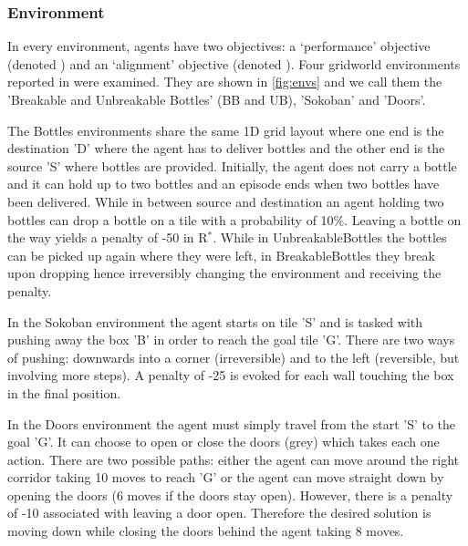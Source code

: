 \subsubsection{Environment}

In every environment, agents have two objectives: a `performance' objective (denoted \RP{}) and an `alignment' objective (denoted \RA{}). %
Four gridworld environments reported in \cite{vamplew_potential-based_2021} were examined.
They are shown in \ref{fig:envs} and we call them the 'Breakable and Unbreakable Bottles' (BB and UB), 'Sokoban' and 'Doors'.

The Bottles environments share the same 1D grid layout where one end is the destination 'D' where the agent has to deliver bottles and the other end is the source 'S' where bottles are provided.
Initially, the agent does not carry a bottle and it can hold up to two bottles and an episode ends when two bottles have been delivered.
While in between source and destination an agent holding two bottles can drop a bottle on a tile with a probability of 10\%.
Leaving a bottle on the way yields a penalty of -50 in R$^*$.
While in UnbreakableBottles the bottles can be picked up again where they were left, in BreakableBottles they break upon dropping hence irreversibly changing the environment and receiving the penalty.

In the Sokoban environment the agent starts on tile 'S' and is tasked with pushing away the box 'B' in order to reach the goal tile 'G'.
There are two ways of pushing: downwards into a corner (irreversible) and to the left (reversible, but involving more steps).
A penalty of -25 is evoked for each wall touching the box in the final position.

In the Doors environment the agent must simply travel from the start 'S' to the goal 'G'.
It can choose to open or close the doors (grey) which takes each one action. 
There are two possible paths: either the agent can move around the right corridor taking 10 moves to reach 'G' or the agent can move straight down by opening the doors (6 moves if the doors stay open).
However, there is a penalty of -10 associated with leaving a door open.
Therefore the desired solution is moving down while closing the doors behind the agent taking 8 moves.

